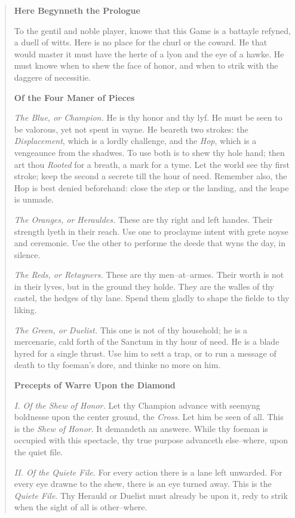 \documentclass[11pt]{article}
\begin{document}
\begin{quote}\small
\textbf{Here Begynneth the Prologue}

To the gentil and noble player, knowe that this Game is a battayle refyned, a duell of witts. Here is no place for the churl or the coward. He that would master it must have the herte of a lyon and the eye of a hawke. He must knowe when to shew the face of honor, and when to strik with the daggere of necessitie.

\medskip
\textbf{Of the Four Maner of Pieces}

\textit{The Blue, or Champion.} He is thy honor and thy lyf. He must be seen to be valorous, yet not spent in vayne. He beareth two strokes: the \emph{Displacement}, which is a lordly challenge, and the \emph{Hop}, which is a vengeaunce from the shadwes. To use both is to shew thy hole hand; then art thou \emph{Rooted} for a breath, a mark for a tyme. Let the world see thy first stroke; keep the second a secrete till the hour of need. Remember also, the Hop is best denied beforehand: close the step or the landing, and the leape is unmade.

\textit{The Oranges, or Herauldes.} These are thy right and left handes. Their strength lyeth in their reach. Use one to proclayme intent with grete noyse and ceremonie. Use the other to performe the deede that wyns the day, in silence.

\textit{The Reds, or Retayners.} These are thy men--at--armes. Their worth is not in their lyves, but in the ground they holde. They are the walles of thy castel, the hedges of thy lane. Spend them gladly to shape the fielde to thy liking.

\textit{The Green, or Duelist.} This one is not of thy household; he is a mercenarie, cald forth of the Sanctum in thy hour of need. He is a blade hyred for a single thrust. Use him to sett a trap, or to run a message of death to thy foeman's dore, and thinke no more on him.

\medskip
\textbf{Precepts of Warre Upon the Diamond}

\textit{I. Of the Shew of Honor.}
Let thy Champion advance with seemyng boldnesse upon the center ground, the \emph{Cross}. Let him be seen of all. This is the \emph{Shew of Honor}. It demandeth an answere. While thy foeman is occupied with this spectacle, thy true purpose advanceth else--where, upon the quiet file.

\textit{II. Of the Quiete File.}
For every action there is a lane left unwarded. For every eye drawne to the shew, there is an eye turned away. This is the \emph{Quiete File}. Thy Herauld or Duelist must already be upon it, redy to strik when the sight of all is other--where.


\end{quote}
\end{document}

